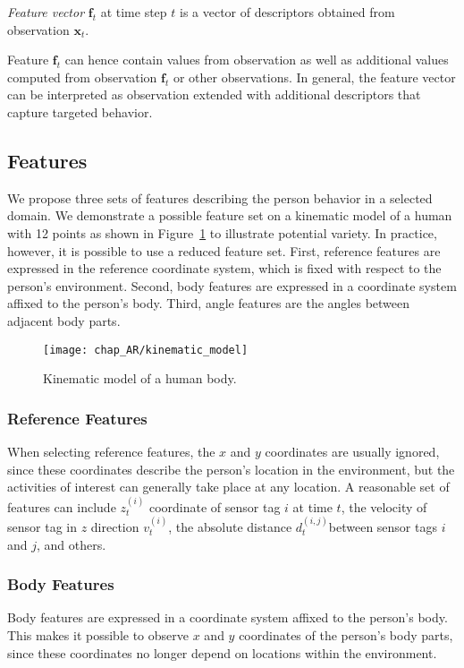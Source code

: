 \begin{definition}
\label{def:feature}
	\emph{Feature vector} $\mathbf{f}_t$ at time step $t$ is a vector of descriptors obtained from observation $\mathbf{x}_t$. 
\end{definition}
\noindent
Feature $\mathbf{f}_t$ can hence contain values from observation as well as additional values computed from observation $\mathbf{f}_t$ or other observations. In general, the feature vector can be interpreted as observation extended with additional descriptors that capture targeted behavior.

\subsection{Features}

We propose three sets of features describing the person behavior in a selected domain. We demonstrate a possible feature set on a kinematic model of a human with 12 points as shown in Figure~\ref{fig:kinematic} to illustrate potential variety. In practice, however, it is possible to use a reduced feature set. First, reference features are expressed in the reference coordinate system, which is fixed with respect to the person's environment. Second, body features are expressed in a coordinate system affixed to the person's body. Third, angle features are the angles between adjacent body parts.

\begin{figure}[!h]
\centering
\texttt{[image: chap\_AR/kinematic\_model]}
\caption{Kinematic model of a human body.}
\label{fig:kinematic}
\end{figure}

\subsubsection{Reference Features}
When selecting reference features, the $x$ and $y$ coordinates are usually ignored, since these coordinates describe the person's location in the environment, but the activities of interest can generally take place at any location. A reasonable set of features can include $z^{(i)}_t$ coordinate of sensor tag $i$ at time $t$, the velocity of sensor tag in $z$ direction $v^{(i)}_t$, the absolute distance $d^{(i,j)}_t$between sensor tags $i$ and $j$, and others.


\subsubsection{Body Features}
Body features are expressed in a coordinate system affixed to the person's body. This makes it possible to observe $x$ and $y$ coordinates of the person's body parts, since these coordinates no longer depend on locations within the environment.

